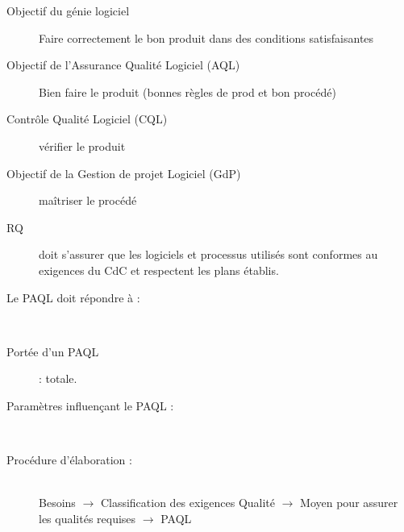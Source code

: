 	\begin{description}
		\item[Objectif du génie logiciel] Faire correctement le bon produit dans des conditions satisfaisantes
		\item[Objectif de l’Assurance Qualité Logiciel (AQL)] Bien faire le produit (bonnes règles de prod et bon procédé)
		\item[Contrôle Qualité Logiciel (CQL)] vérifier le produit
		\item[Objectif de la Gestion de projet Logiciel (GdP)] maîtriser le procédé
		\item[RQ] doit s’assurer que les logiciels et processus utilisés sont conformes au exigences du CdC et respectent les plans établis.
	\end{description}
\begin{description}
	\item [Le PAQL doit répondre à :]\hfill\\

    \item [Portée d’un PAQL] : totale.\\

    \item [Paramètres influençant le PAQL :]\hfill\\

    \item [Procédure d’élaboration :]\hfill\\
	    Besoins $\rightarrow$ Classification des exigences Qualité $\rightarrow$ Moyen pour assurer les qualités requises $\rightarrow$ PAQL
\end{description}

